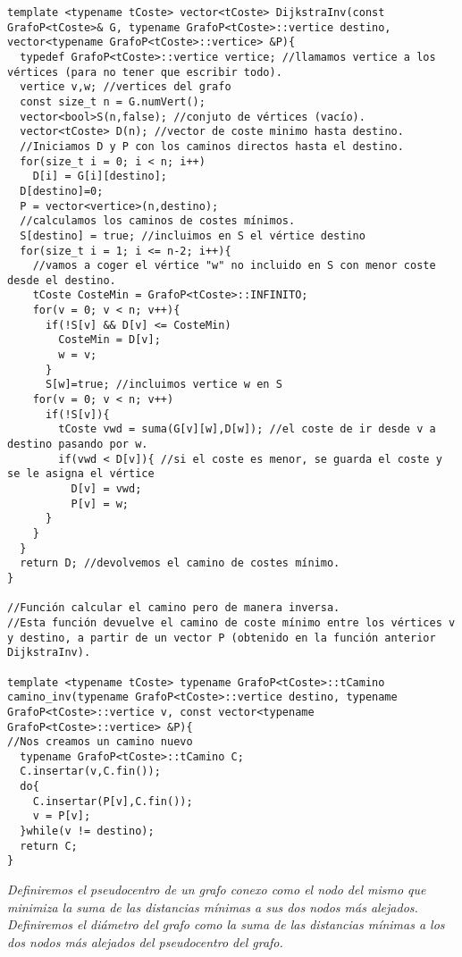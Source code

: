 \begin{verbatim}
template <typename tCoste> vector<tCoste> DijkstraInv(const GrafoP<tCoste>& G, typename GrafoP<tCoste>::vertice destino, vector<typename GrafoP<tCoste>::vertice> &P){
  typedef GrafoP<tCoste>::vertice vertice; //llamamos vertice a los vértices (para no tener que escribir todo).
  vertice v,w; //vertices del grafo
  const size_t n = G.numVert();
  vector<bool>S(n,false); //conjuto de vértices (vacío).
  vector<tCoste> D(n); //vector de coste minimo hasta destino.
  //Iniciamos D y P con los caminos directos hasta el destino.
  for(size_t i = 0; i < n; i++)
    D[i] = G[i][destino];
  D[destino]=0;
  P = vector<vertice>(n,destino);
  //calculamos los caminos de costes mínimos.
  S[destino] = true; //incluimos en S el vértice destino
  for(size_t i = 1; i <= n-2; i++){
    //vamos a coger el vértice "w" no incluido en S con menor coste desde el destino.
    tCoste CosteMin = GrafoP<tCoste>::INFINITO;
    for(v = 0; v < n; v++){
      if(!S[v] && D[v] <= CosteMin)
        CosteMin = D[v];
        w = v;
      }
      S[w]=true; //incluimos vertice w en S
    for(v = 0; v < n; v++)
      if(!S[v]){
        tCoste vwd = suma(G[v][w],D[w]); //el coste de ir desde v a destino pasando por w.
        if(vwd < D[v]){ //si el coste es menor, se guarda el coste y se le asigna el vértice
          D[v] = vwd;
          P[v] = w;
      }
    }
  }
  return D; //devolvemos el camino de costes mínimo.
}

//Función calcular el camino pero de manera inversa.
//Esta función devuelve el camino de coste mínimo entre los vértices v y destino, a partir de un vector P (obtenido en la función anterior DijkstraInv).

template <typename tCoste> typename GrafoP<tCoste>::tCamino camino_inv(typename GrafoP<tCoste>::vertice destino, typename GrafoP<tCoste>::vertice v, const vector<typename GrafoP<tCoste>::vertice> &P){
//Nos creamos un camino nuevo
  typename GrafoP<tCoste>::tCamino C;
  C.insertar(v,C.fin());
  do{
    C.insertar(P[v],C.fin());
    v = P[v];
  }while(v != destino);
  return C;
}
\end{verbatim}

\textbf{\large{}}\textit{ Definiremos el pseudocentro de un grafo conexo como el nodo del mismo que minimiza la suma de las distancias mínimas a sus dos nodos más alejados. Definiremos el diámetro del grafo como la suma de las distancias mínimas a los dos nodos más alejados del pseudocentro del grafo.}

